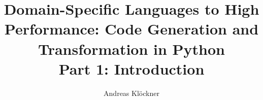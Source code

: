 \documentclass[english,compress]{beamer}
\begin{document}

\title[DSL to High Performance]{
  Domain-Specific
  Languages to High Performance: Code Generation and Transformation in
  Python\\
  Part 1: Introduction
}

\author{
  Andreas Klöckner\\
}


\date{}

\frame{
  \titlepage
}
\end{document}
